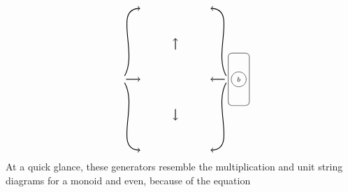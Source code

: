 \documentclass[11pt]{amsart}
\theoremstyle{remark}
\theoremstyle{definition}
\begin{document}
\[{\begin{tikzpicture}[scale=0.95]
\begin{scope}
\draw[rounded corners,line width=.3mm, gray] (2,0) rectangle (2.8,2);
\node [style=circle,draw=black] at (2.4,1) {\scriptsize $b$};
\end{scope}
\node (v1) at (-2,1) {};
\node (v2) at (-1.2,1) {};
\draw [thick,->]  (v1) edge (v2);
\node (v3) at (2,1) {};
\node (v4) at (1.2,1) {};
\draw [thick,->] (v3) edge (v4);
\node (v14) at (0,2) {};
\node (v15) at (0,2.7) {};
\draw [thick,->] (v14) edge (v15);
\node (v16) at (0,0) {};
\node (v17) at (0,-0.7) {};
\draw [thick,->] (v16) edge (v17);
\node (v18) at (-1.2,3.7) {};
\node (v19) at (-1.2,-1.7) {};
\draw [thick,->] (v1) edge [in=180, out=60] (v18);
\draw [thick,->] (v1) edge [in=180, out=-60] (v19);
\node (v20) at (1.2,3.7) {};
\node (v21) at (1.2,-1.7) {};
\draw [thick,->](v3) edge [in=0, out=120] (v20);
\draw [thick,->] (v3) edge [in=0, out=-120] (v21);
\end{tikzpicture}
}
\] 
At a quick glance, these generators resemble the multiplication and unit string diagrams for a monoid and even, because of the equation
\end{document}
